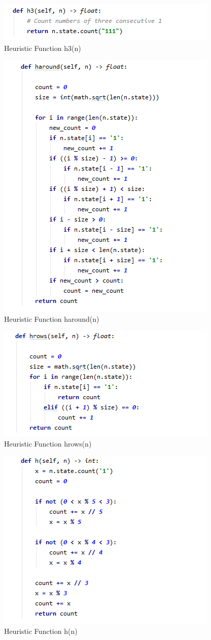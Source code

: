 \begin{figure}[H]
\includegraphics[width=0.5\linewidth]{assets/h3.PNG}
\caption{Heuristic Function h3(n)} \label{h3 profiling}
\end{figure}

\begin{figure}[H]
\includegraphics[width=0.5\linewidth]{assets/haround.PNG}
\caption{Heuristic Function haround(n)} \label{haround profiling}
\end{figure}

\begin{figure}[H]
\includegraphics[width=0.5\linewidth]{assets/hrows.PNG}
\caption{Heuristic Function hrows(n)} \label{hrows}
\end{figure}

\begin{figure}[H]
\includegraphics[width=0.5\linewidth]{assets/h.PNG}
\caption{Heuristic Function h(n)} \label{h}
\end{figure}